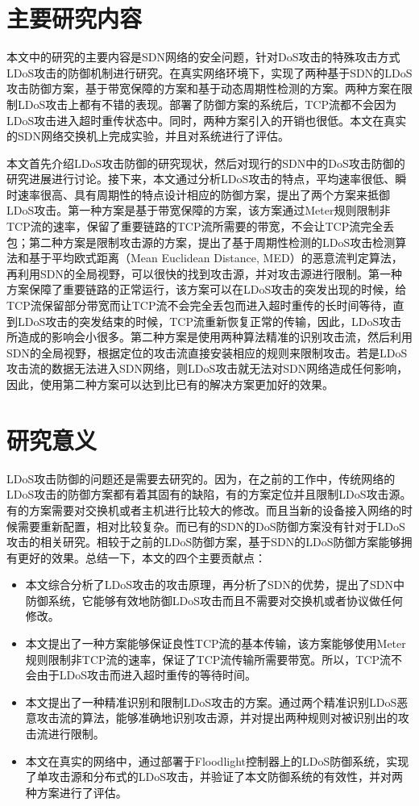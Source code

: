 \section{主要研究内容}
\label{sec:work}
本文中的研究的主要内容是SDN网络的安全问题，针对DoS攻击的特殊攻击方式LDoS攻击的防御机制进行研究。在真实网络环境下，实现了两种基于SDN的LDoS攻击防御方案，基于带宽保障的方案和基于动态周期性检测的方案。两种方案在限制LDoS攻击上都有不错的表现。部署了防御方案的系统后，TCP流都不会因为LDoS攻击进入超时重传状态中。同时，两种方案引入的开销也很低。本文在真实的SDN网络交换机上完成实验，并且对系统进行了评估。

本文首先介绍LDoS攻击防御的研究现状，然后对现行的SDN中的DoS攻击防御的研究进展进行讨论。接下来，本文通过分析LDoS攻击的特点，平均速率很低、瞬时速率很高、具有周期性的特点设计相应的防御方案，提出了两个方案来抵御LDoS攻击。第一种方案是基于带宽保障的方案，该方案通过Meter规则限制非TCP流的速率，保留了重要链路的TCP流所需要的带宽，不会让TCP流完全丢包；第二种方案是限制攻击源的方案，提出了基于周期性检测的LDoS攻击检测算法和基于平均欧式距离（Mean Euclidean Distance, MED）的恶意流判定算法，再利用SDN的全局视野，可以很快的找到攻击源，并对攻击源进行限制。第一种方案保障了重要链路的正常运行，该方案可以在LDoS攻击的突发出现的时候，给TCP流保留部分带宽而让TCP流不会完全丢包而进入超时重传的长时间等待，直到LDoS攻击的突发结束的时候，TCP流重新恢复正常的传输，因此，LDoS攻击所造成的影响会小很多。第二种方案是使用两种算法精准的识别攻击流，然后利用SDN的全局视野，根据定位的攻击流直接安装相应的规则来限制攻击。若是LDoS攻击流的数据无法进入SDN网络，则LDoS攻击就无法对SDN网络造成任何影响，因此，使用第二种方案可以达到比已有的解决方案更加好的效果。


\section{研究意义}
\label{sec:contribution}
LDoS攻击防御的问题还是需要去研究的。因为，在之前的工作中，传统网络的LDoS攻击的防御方案都有着其固有的缺陷，有的方案定位并且限制LDoS攻击源。有的方案需要对交换机或者主机进行比较大的修改。而且当新的设备接入网络的时候需要重新配置，相对比较复杂。而已有的SDN的DoS防御方案没有针对于LDoS攻击的相关研究。相较于之前的LDoS防御方案，基于SDN的LDoS防御方案能够拥有更好的效果。总结一下，本文的四个主要贡献点：

\begin{itemize}
    \item 本文综合分析了LDoS攻击的攻击原理，再分析了SDN的优势，提出了SDN中防御系统，它能够有效地防御LDoS攻击而且不需要对交换机或者协议做任何修改。
    \item 本文提出了一种方案能够保证良性TCP流的基本传输，该方案能够使用Meter规则限制非TCP流的速率，保证了TCP流传输所需要带宽。所以，TCP流不会由于LDoS攻击而进入超时重传的等待时间。
    \item 本文提出了一种精准识别和限制LDoS攻击的方案。通过两个精准识别LDoS恶意攻击流的算法，能够准确地识别攻击源，并对提出两种规则对被识别出的攻击流进行限制。
    \item 本文在真实的网络中，通过部署于Floodlight控制器上的LDoS防御系统，实现了单攻击源和分布式的LDoS攻击，并验证了本文防御系统的有效性，并对两种方案进行了评估。
\end{itemize}

